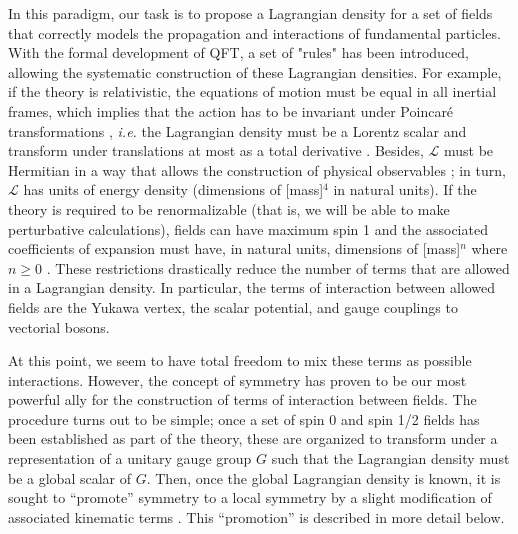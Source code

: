 In this paradigm, our task is to propose a Lagrangian density for a set of fields that correctly models the propagation and interactions of fundamental particles. With the formal development of QFT, a set of "rules" has been introduced, allowing the systematic construction of these Lagrangian densities.  For example, if the theory is relativistic, the equations of motion must be equal in all inertial frames, which implies that the action has to be invariant under Poincaré transformations \cite{pall}, \textit{i.e.} the Lagrangian density must be a Lorentz scalar and transform under translations at most as a total derivative \cite{jose1998classical}. Besides, $\mathcal{L}$ must be Hermitian in a way that allows the construction of physical observables \cite{pall,peskin}; in turn, $\mathcal{L}$ has units of energy density (dimensions of [mass]$^4$ in natural units). If the theory is required to be renormalizable (that is, we will be able to make perturbative calculations), fields can have maximum spin 1 and the associated coefficients of expansion must have, in natural units, dimensions of [mass]$^n$ where $n\geq0$ \cite{peskin,Weinberg}. These restrictions drastically reduce the number of terms that are allowed in a Lagrangian density. In particular, the terms of interaction between allowed fields are the Yukawa vertex, the scalar potential, and gauge couplings to vectorial bosons. 

At this point, we seem to have total freedom to mix these terms as possible interactions. However, the concept of symmetry has proven to be our most powerful ally for the construction of terms of interaction between fields. 
The procedure turns out to be simple; once a set of spin 0 and spin 1/2 fields has been established as part of the theory, these are organized to transform under a representation of a unitary gauge group $G$ such that the Lagrangian density must be a global scalar of $G$. Then, once the global Lagrangian density is known, it is sought to ``promote'' symmetry to a local symmetry by a slight modification of associated kinematic terms \cite{pokorski2000gauge,freedman2012supergravity, Gallego2016,VanProeyen1999,Martin2012}.
This ``promotion'' is described in more detail below.

